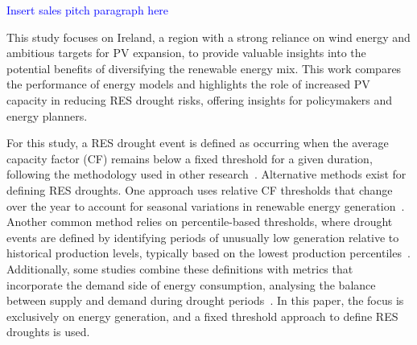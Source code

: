 \documentclass[a4paper, 11pt]{article}
\begin{document}
\textcolor{blue}{Insert sales pitch paragraph here}

This study focuses on Ireland, a region with a strong reliance on wind energy and ambitious targets for PV expansion, to provide valuable insights into the potential benefits of diversifying the renewable energy mix. This work compares the performance of energy models and highlights the role of increased PV capacity in reducing RES drought risks, offering insights for policymakers and energy planners.


For this study, a RES drought event is defined as occurring when the average capacity factor (CF) remains below a fixed threshold for a given duration, following the methodology used in other research~\cite{kaspar2019drought, ohba2022drought, mockert2023drought, mayer2023drought}. Alternative methods exist for defining RES droughts. One approach uses relative CF thresholds that change over the year to account for seasonal variations in renewable energy generation~\cite{raynaud2018drought, rinaldi2021drought, gangopadhyay2022drought, allen2023drought, kapica2024drought}. Another common method relies on percentile-based thresholds, where drought events are defined by identifying periods of unusually low generation relative to historical production levels, typically based on the lowest production percentiles~\cite{bracken2024drought, allen2023drought}. Additionally, some studies combine these definitions with metrics that incorporate the demand side of energy consumption, analysing the balance between supply and demand during drought periods~\cite{raynaud2018drought, rinaldi2021drought, allen2023drought, bracken2024drought}. In this paper, the focus is exclusively on energy generation, and a fixed threshold approach to define RES droughts is used. 
\end{document}
